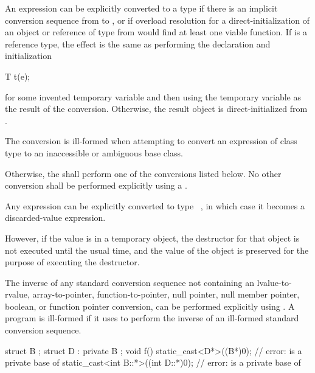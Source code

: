 \pnum
An expression  can be explicitly converted to a type 
if there is an implicit conversion sequence
from  to , or
if overload resolution for a direct-initialization
of an object or reference of type  from 
would find at least one viable function.
If  is a reference type, the effect is
the same as performing the declaration and initialization
\begin{codeblock}
T t(e);
\end{codeblock}
for some invented temporary variable 
and then using the temporary variable as the result of the conversion.
Otherwise, the result object is direct-initialized from .
\begin{note}
The conversion is ill-formed when attempting to convert an
expression of class type to an inaccessible or ambiguous base class.
\end{note}

\pnum
Otherwise, the  shall perform one of the conversions
listed below. No other conversion shall be performed explicitly using a
.

\pnum
Any expression can be explicitly converted to type \cv{}~,
in which case it becomes a discarded-value
expression.
\begin{note}
However, if the value is in a temporary
object, the destructor for that
object is
not executed until the usual time, and the value of the object is
preserved for the purpose of executing the destructor.
\end{note}


\pnum
The inverse of any standard conversion sequence not containing an
lvalue-to-rvalue,
array-to-pointer,
function-to-pointer,
null pointer, null member pointer,
boolean, or
function pointer
conversion, can be performed explicitly using . A
program is ill-formed if it uses  to perform the
inverse of an ill-formed standard conversion sequence.
\begin{example}
\begin{codeblock}
struct B { };
struct D : private B { };
void f() {
  static_cast<D*>((B*)0);               // error:  is a private base of 
  static_cast<int B::*>((int D::*)0);   // error:  is a private base of 
}
\end{codeblock}
\end{example}

